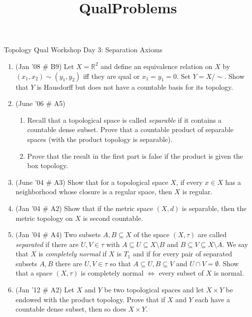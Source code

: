 \documentclass[psamsfonts, 11pt, reqno]{amsart}
\title{QualProblems}
\begin{document}
\begin{center}
\begin{large}
Topology Qual Workshop Day 3: Separation Axioms
\end{large}
\end{center}
\vspace{.25in}

\begin{enumerate}
\item (Jan '08 \# B9) Let $X = \mathbb{R}^2$ and define an equivalence relation on $X$ by $(x_1, x_2) \sim (y_1,y_2)$  iff
they are qual or $x_1 = y_1 = 0$.  Set $Y = X/ \sim$.  Show that $Y$ is Hausdorff but does not have a countable basis
for its topology.

\vfill

\item (June '06 \# A5) 
\begin{enumerate}
\item Recall that a topological space is called \emph{separable} if it contains a countable dense subset.  Prove that
a countable product of separable spaces (with the product topology is separable).

\item Prove that the result in the first part is false if the product is given the box topology.
\end{enumerate}
\vfill

\item (June '04 \# A3) Show that for a topological space $X$, if every $x \in X$ has a neighborhood whose closure
is a regular space, then $X$ is regular.
\vfill


\item (Jan '04 \# A2) Show that if the metric space $(X, d)$ is separable, then the metric topology on $X$ is second countable.
\vfill

\item (Jan '04 \# A4) Two subsets $A, B \subseteq X$ of the space $(X, \tau)$ are called \emph{separated} if
there are $U,V \in \tau$ with $A \subseteq U \subseteq X \setminus B$ and $B \subseteq V \subseteq X \setminus A$.  We
say that $X$ is \emph{completely normal} if $X$ is $T_1$ and if for every pair of separated subsets $A,B$ there are
$U,V \in \tau$ so that $A \subseteq U, B \subseteq V$ and $U \cap V = \emptyset$.  Show that a space $(X, \tau)$ is
completely normal $\Leftrightarrow$ every subset of $X$ is normal.
\vfill

\item (Jan '12 \# A2) Let $X$ and $Y$ be two topological spaces and let $X \times Y$ be endowed with the product topology.
Prove that if $X$ and $Y$ each have a countable dense subset, then so does $X \times Y$.


\end{enumerate}
\end{document}
